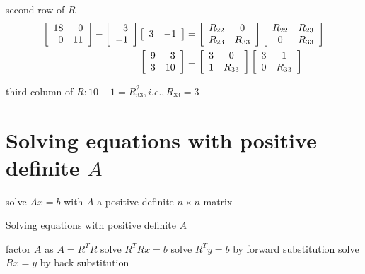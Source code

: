 \begin{example}
second row of $ R $
\begin{equation}\displaystyle \begin{aligned}
    \left[\begin{array}{ r r }
    18 & 0\\
    0 & 11
    \end{array}\right] -\left[\begin{array}{ r }
    3\\
    -1
    \end{array}\right]\left[\begin{array}{ l l }
    3 & -1
    \end{array}\right] & =\left[\begin{array}{ c c }
    R_{22} & 0\\
    R_{23} & R_{33}
    \end{array}\right]\left[\begin{array}{ c c }
    R_{22} & R_{23}\\
    0 & R_{33}
    \end{array}\right]\\
    \left[\begin{array}{ r r }
    9 & 3\\
    3 & 10
    \end{array}\right] & =\left[\begin{array}{ c c }
    3 & 0\\
    1 & R_{33}
    \end{array}\right]\left[\begin{array}{ c c }
    3 & 1\\
    0 & R_{33}
    \end{array}\right]
    \end{aligned}\end{equation}

third column of $ R: 10-1=R_{33}^{2}, i . e ., R_{33}=3 $
\end{example}

\section{Solving equations with positive definite $A$}

\begin{problem}
    solve $ A x=b $ with $ A $ a positive definite $ n \times n $ matrix
\end{problem}

\begin{algorithm}[htbp]
    \caption{Solving equations with positive definite $A$}
    factor $ A $ as $ A=R^{T} R $\;
    solve $ R^{T} R x=b $\;
    solve $ R^{T} y=b $ by forward substitution\;
    solve $ R x=y $ by back substitution\;
\end{algorithm}


